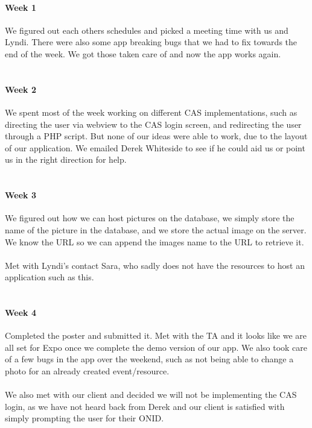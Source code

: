 \documentclass[onecolumn, draftclsnofoot,10pt, compsoc]{IEEEtran}
\begin{document}
      \paragraph{Week 1}
      We figured out each others schedules and picked a meeting time with us and Lyndi. There were also some app breaking bugs that we had to fix towards the end of the week. We got those taken care of and now the app works again. \\ \\

      \paragraph{Week 2}
      We spent most of the week working on different CAS implementations, such as directing the user via webview to the CAS login screen, and redirecting the user through a PHP script. But none of our ideas were able to work, due to the layout of our application. We emailed Derek Whiteside to see if he could aid us or point us in the right direction for help. \\ \\

      \paragraph{Week 3}
      We figured out how we can host pictures on the database, we simply store the name of the picture in the database, and we store the actual image on the server. We know the URL so we can append the images name to the URL to retrieve it. \\ \\
      Met with Lyndi's contact Sara, who sadly does not have the resources to host an application such as this. \\ \\

      \paragraph{Week 4}
      Completed the poster and submitted it. Met with the TA and it looks like we are all set for Expo once we complete the demo version of our app. We also took care of a few bugs in the app over the weekend, such as not being able to change a photo for an already created event/resource. \\ \\
      We also met with our client and decided we will not be implementing the CAS login, as we have not heard back from Derek and our client is satisfied with simply prompting the user for their ONID. \\ \\
\end{document}
